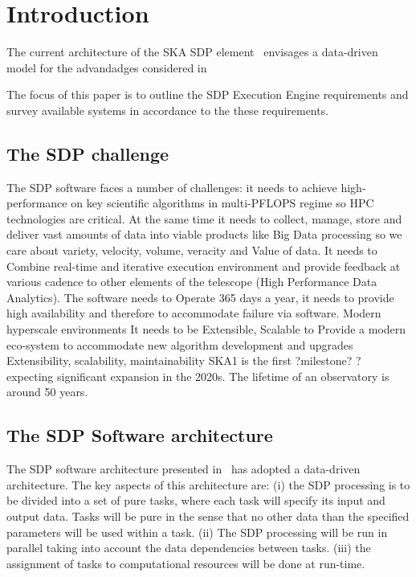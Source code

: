 \documentclass[11pt,a4paper]{article}
\title{}
\begin{document}
\sdpfrontpage

\section{Introduction}

The current architecture of the SKA SDP element~\cite{SDParch} envisages a 
data-driven model for the advandadges considered in~\cite{DDchoice}

The focus of this paper is to outline the SDP Execution Engine requirements
and survey available systems in accordance to the these 
requirements.

\subsection{The SDP challenge}
The SDP software faces a number of challenges: it needs to achieve high-performance on key scientific algorithms in multi-PFLOPS regime so HPC technologies are critical. At the same time it needs to collect, manage, store and deliver vast amounts of data into viable products like Big Data processing so we care about variety, velocity, volume, veracity and Value of data.  It needs to Combine real-time and iterative execution environment and provide feedback at various cadence to other elements of the telescope (High Performance Data Analytics). The software needs to Operate 365 days a year, it needs to provide high availability and therefore to accommodate failure via software. Modern hyperscale environments
It needs to be Extensible, Scalable to Provide a modern eco-system to accommodate new algorithm development and upgrades
Extensibility, scalability, maintainability
SKA1 is the first ?milestone? ? expecting significant expansion in the 2020s. The lifetime of an observatory is around 50 years. 

\subsection{The SDP Software architecture}
The SDP software architecture presented in~\cite{SDParch} has adopted a data-driven architecture. The key aspects of this architecture 
are: (i) the SDP processing is to be divided into a set of pure tasks, where each task will specify its input and output data. 
Tasks will be pure in the sense that no other data than the specified parameters will be used within a task. (ii) The SDP processing 
will be run in parallel taking into account the data dependencies between tasks. (iii) the assignment of tasks to computational resources will be done
at run-time. 
\end{document}
